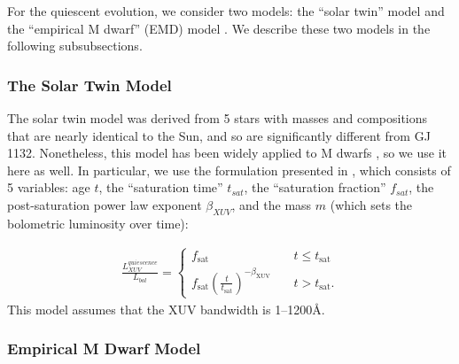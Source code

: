 \documentclass[preprint]{aastex631}
\def\eg{{\it e.g., }}
\begin{document}
For the quiescent evolution, we consider two models: the ``solar twin'' model \citep[][hereafter Ribas05]{Ribas05} and the ``empirical M dwarf'' (EMD) model \citep[][]{EngleGuinan23,Engle24}. We describe these two models in the following subsubsections.

\subsubsection{The Solar Twin Model\label{sec:solartwin}} 

The solar twin model was derived from 5 stars with masses and compositions that are nearly identical to the Sun, and so are significantly different from GJ 1132. Nonetheless, this model has been widely applied to M dwarfs \citep[\eg][]{LugerBarnes15,ZahnleCatling17,Mordasini20,EveOwen25,Fleming20}, so we use it here as well. In particular, we use the formulation presented in \cite{LugerBarnes15}, which consists of 5 variables: age $t$, the ``saturation time'' $t_{sat}$, the ``saturation fraction'' $f_{sat}$, the post-saturation power law exponent $\beta_{XUV}$, and the mass $m$ (which sets the bolometric luminosity over time): 

\begin{align}
\label{eq:lxuv}
\frac{L_{XUV}^{quiescence}}{L_{bol}} = \left\{
        \begin{array}{lcr}
            f_\mathrm{sat} &\ & t \leq t_\mathrm{sat} \\
            f_\mathrm{sat}\left(\frac{t}{t_\mathrm{sat}}\right)^{-\beta_\mathrm{XUV}} &\ & t > t_\mathrm{sat}.
        \end{array}
    \right.
\end{align}
This model assumes that the XUV bandwidth is 1--1200\AA.


\subsubsection{Empirical M Dwarf Model\label{sec:empirical}} 
\end{document}
